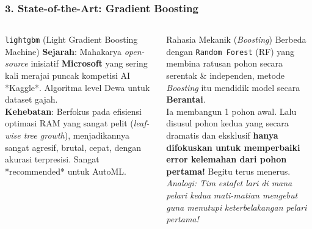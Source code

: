 \documentclass[t,aspectratio=169,xcolor=dvipsnames]{beamer}
\begin{document}
\begin{frame}
    \frametitle{3. State-of-the-Art: Gradient Boosting}
    \scriptsize
    \begin{columns}[T]
        \begin{block}{\texttt{lightgbm} (Light Gradient Boosting Machine)}
            \textbf{Sejarah}: Mahakarya \textit{open-source} inisiatif \textbf{Microsoft} yang sering kali merajai puncak kompetisi AI *Kaggle*. Algoritma level Dewa untuk dataset gajah.\\
            \vspace{0.2cm}
            \textbf{Kehebatan}: Berfokus pada efisiensi optimasi RAM yang sangat pelit (\textit{leaf-wise tree growth}), menjadikannya sangat agresif, brutal, cepat, dengan akurasi terpresisi. Sangat *recommended* untuk AutoML.
        \end{block}

        \begin{alertblock}{Rahasia Mekanik (\textit{Boosting})}
            Berbeda dengan \texttt{Random Forest} (RF) yang membina ratusan pohon secara serentak \& independen, metode \textit{Boosting} itu mendidik model secara \textbf{Berantai}.\\
            \vspace{0.2cm}
            Ia membangun 1 pohon awal. Lalu disusul pohon kedua yang secara dramatis dan eksklusif \textbf{hanya difokuskan untuk memperbaiki error kelemahan dari pohon pertama!} Begitu terus menerus.\\
            \vspace{0.2cm}
            \colorbox{yellow!40}{\textit{Analogi: Tim estafet lari di mana pelari kedua}}
            \colorbox{yellow!40}{\textit{mati-matian mengebut guna menutupi}}
            \colorbox{yellow!40}{\textit{keterbelakangan pelari pertama!}}
        \end{alertblock}
    \end{columns}
\end{frame}
\end{document}
